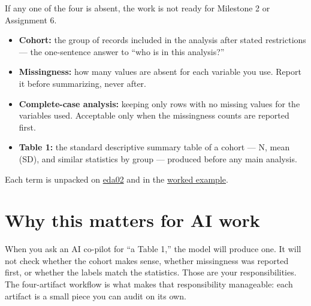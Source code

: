 \documentclass[
  letterpaper,
  DIV=11,
  numbers=noendperiod,
  oneside]{scrreprt}
\providecommand{\tightlist}{%
  \setlength{\itemsep}{0pt}\setlength{\parskip}{0pt}}
\begin{document}
If any one of the four is absent, the work is not ready for Milestone 2
or Assignment 6.

\begin{tcolorbox}[enhanced jigsaw, title=\textcolor{quarto-callout-note-color}{\faInfo}\hspace{0.5em}{Key Terms This Week}, arc=.35mm, toptitle=1mm, colframe=quarto-callout-note-color-frame, toprule=.15mm, leftrule=.75mm, bottomtitle=1mm, opacityback=0, bottomrule=.15mm, coltitle=black, breakable, opacitybacktitle=0.6, titlerule=0mm, colback=white, left=2mm, colbacktitle=quarto-callout-note-color!10!white, rightrule=.15mm]

\begin{itemize}
\tightlist
\item
  \textbf{Cohort:} the group of records included in the analysis after
  stated restrictions --- the one-sentence answer to ``who is in this
  analysis?''
\item
  \textbf{Missingness:} how many values are absent for each variable you
  use. Report it before summarizing, never after.
\item
  \textbf{Complete-case analysis:} keeping only rows with no missing
  values for the variables used. Acceptable only when the missingness
  counts are reported first.
\item
  \textbf{Table 1:} the standard descriptive summary table of a cohort
  --- N, mean (SD), and similar statistics by group --- produced before
  any main analysis.
\end{itemize}

Each term is unpacked on \href{eda02-cohort-and-missingness.qmd}{eda02}
and in the \href{eda03-worked-example.qmd}{worked example}.

\end{tcolorbox}

\section*{Why this matters for AI
work}\label{why-this-matters-for-ai-work}


When you ask an AI co-pilot for ``a Table 1,'' the model will produce
one. It will not check whether the cohort makes sense, whether
missingness was reported first, or whether the labels match the
statistics. Those are your responsibilities. The four-artifact workflow
is what makes that responsibility manageable: each artifact is a small
piece you can audit on its own.
\end{document}
